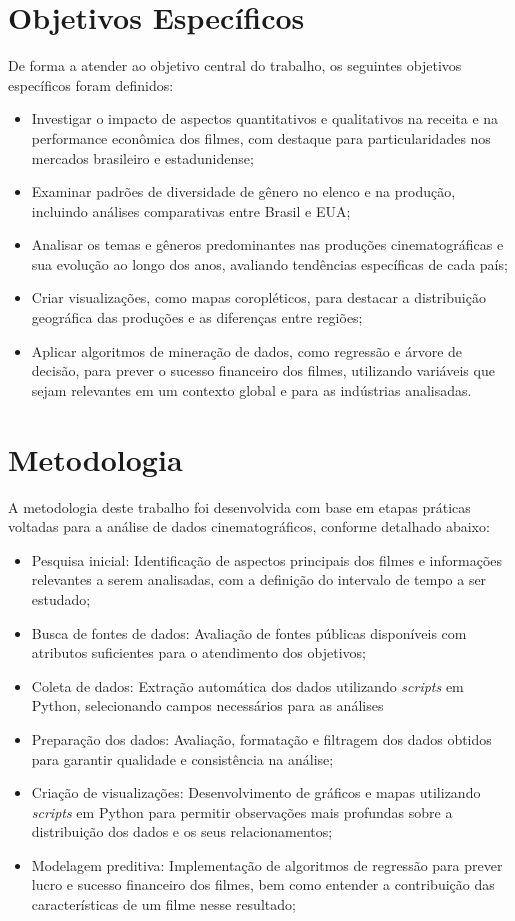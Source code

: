 \section{Objetivos Específicos}
De forma a atender ao objetivo central do trabalho, os seguintes objetivos específicos foram definidos:
\begin{itemize}
    \item Investigar o impacto de aspectos quantitativos e qualitativos na receita e na performance econômica dos filmes, com destaque para particularidades nos mercados brasileiro e estadunidense;
    \item Examinar padrões de diversidade de gênero no elenco e na produção, incluindo análises comparativas entre Brasil e EUA;
    \item Analisar os temas e gêneros predominantes nas produções cinematográficas e sua evolução ao longo dos anos, avaliando tendências específicas de cada país;
    \item Criar visualizações, como mapas coropléticos, para destacar a distribuição geográfica das produções e as diferenças entre regiões;
    \item Aplicar algoritmos de mineração de dados, como regressão e árvore de decisão, para prever o sucesso financeiro dos filmes, utilizando variáveis que sejam relevantes em um contexto global e para as indústrias analisadas.
\end{itemize}


\section{Metodologia}
A metodologia deste trabalho foi desenvolvida com base em etapas práticas voltadas para a análise de dados cinematográficos, conforme detalhado abaixo:
\begin{itemize}
    \item Pesquisa inicial: Identificação de aspectos principais dos filmes e informações relevantes a serem analisadas, com a definição do intervalo de tempo a ser estudado;
    \item Busca de fontes de dados: Avaliação de fontes públicas disponíveis com atributos suficientes para o atendimento dos objetivos;
    \item Coleta de dados: Extração automática dos dados utilizando \textit{scripts} em Python, selecionando campos necessários para as análises
    \item Preparação dos dados: Avaliação, formatação e filtragem dos dados obtidos para garantir qualidade e consistência na análise;
    \item Criação de visualizações: Desenvolvimento de gráficos e mapas utilizando \textit{scripts} em Python para permitir observações mais profundas sobre a distribuição dos dados e os seus relacionamentos;
    \item Modelagem preditiva: Implementação de algoritmos de regressão para prever lucro e sucesso financeiro dos filmes, bem como entender a contribuição das características de um filme nesse resultado;
\end{itemize}

